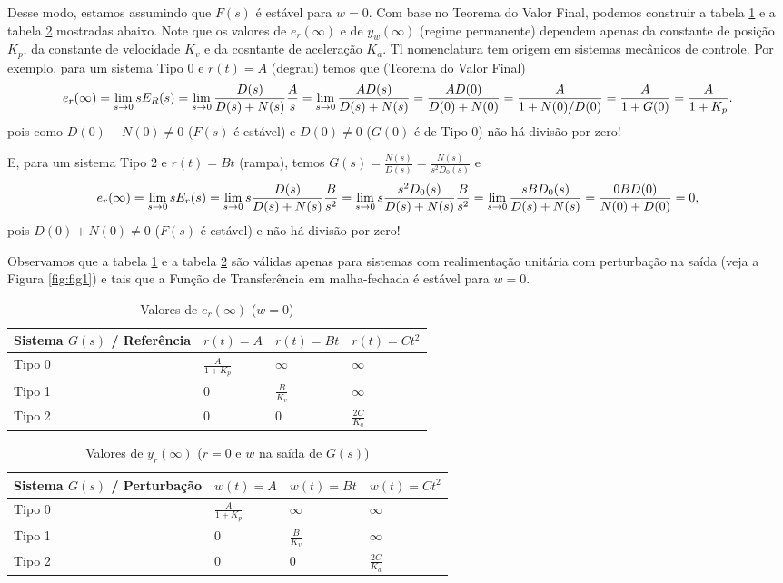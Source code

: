 \documentclass[
]{book}
\begin{document}
Desse modo, estamos assumindo que \(F(s)\) é estável para \(w=0\). Com base no Teorema do Valor Final, podemos construir a tabela \ref{tab:tab1} e a tabela \ref{tab:tab2} mostradas abaixo. Note que os valores de \(e_r(\infty)\) e de \(y_w(\infty)\) (regime permanente) dependem apenas da constante de posição \(K_p\), da constante de velocidade \(K_v\) e da cosntante de aceleração \(K_a\). Tl nomenclatura tem origem em sistemas mecânicos de controle. Por exemplo, para um sistema Tipo 0 e \(r(t)=A\) (degrau) temos que (Teorema do Valor Final)
\[
e_r(\infty) = \lim\limits_{s \to 0}{sE_R(s)}=\lim\limits_{s\to0}{\frac{D(s)}{D(s)+N(s)}\frac{A}{s}} = \lim\limits_{s\to0}{\frac{AD(s)}{D(s)+N(s)}} \\
= \frac{AD(0)}{D(0) + N(0)} = \frac{A}{1+N(0)/D(0)} = \frac{A}{1+G(0)} = \frac {A}{1+K_p}.
\]
pois como \(D(0) + N(0) \neq 0\) (\(F(s)\) é estável) e \(D(0) \neq 0\) (\(G(0)\) é de Tipo 0) não há divisão por zero!

E, para um sistema Tipo 2 e \(r(t) = Bt\) (rampa), temos \(G(s) = \frac{N(s)}{D(s)} = \frac{N(s)}{s^2D_0(s)}\) e
\[
e_r(\infty) = \lim\limits_{s \to 0}{sE_r(s) = \lim\limits_{s \to 0}{s\frac{D(s)}{D(s)+N(s)}\frac{B}{s^2}}} = \lim\limits_{s \to 0}{s\frac{s^2D_0(s)}{D(s)+N(s)}\frac{B}{s^2}}\\
=\lim\limits_{s \to 0}{\frac{sBD_0(s)}{D(s)+N(s)}}=\frac{0BD(0)}{N(0)+D(0)}=0,
\]
pois \(D(0) + N(0) \neq 0\) (\(F(s)\) é estável) e não há divisão por zero!

Observamos que a tabela \ref{tab:tab1} e a tabela \ref{tab:tab2} são válidas apenas para sistemas com realimentação unitária com perturbação na saída (veja a Figura \ref{fig:fig1}) e tais que a Função de Transferência em malha-fechada é estável para \(w=0\).

\begin{table}

\caption{\label{tab:tab1}Valores de $e_r(\infty)$ ($w=0$)}
\centering
\begin{tabular}[t]{llll}
\toprule
Sistema $G(s)$ / Referência & $r(t)=A$ & $r(t) = Bt$ & $r(t) = Ct^2$\\
\midrule
Tipo 0 & $\frac{A}{1 + K_p}$ & $\infty$ & $\infty$\\
Tipo 1 & 0 & $\frac{B}{K_v}$ & $\infty$\\
Tipo 2 & 0 & 0 & $\frac{2C}{K_a}$\\
\bottomrule
\end{tabular}
\end{table}

\begin{table}

\caption{\label{tab:tab2}Valores de $y_r(\infty)$ ($r=0$ e $w$ na saída de $G(s)$)}
\centering
\begin{tabular}[t]{llll}
\toprule
Sistema $G(s)$ / Perturbação & $w(t)=A$ & $w(t) = Bt$ & $w(t) = Ct^2$\\
\midrule
Tipo 0 & $\frac{A}{1 + K_p}$ & $\infty$ & $\infty$\\
Tipo 1 & 0 & $\frac{B}{K_v}$ & $\infty$\\
Tipo 2 & 0 & 0 & $\frac{2C}{K_a}$\\
\bottomrule
\end{tabular}
\end{table}
\end{document}

